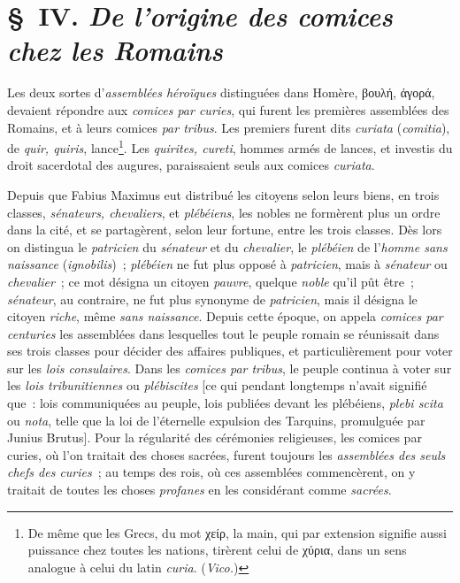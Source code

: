 \documentclass[french,twoside]{book} %
\begin{document}
\section[{§ IV. De l’origine des comices chez les Romains}]{§ IV. {\itshape De l’origine des comices chez les Romains}}
\noindent  Les deux sortes d’{\itshape assemblées héroïques} distinguées dans Homère, βουλή, ἀγορά, devaient répondre aux {\itshape comices par curies}, qui furent les premières assemblées des Romains, et à leurs comices {\itshape par tribus}. Les premiers furent dits {\itshape curiata} ({\itshape comitia}), de {\itshape quir, quiris}, lance\footnote{De même que les Grecs, du mot χείρ, la main, qui par extension signifie aussi puissance chez toutes les nations, tirèrent celui de χύρια, dans un sens analogue à celui du latin {\itshape curia}. ({\itshape Vico.})}. Les {\itshape quirites, cureti}, hommes armés de lances, et investis du droit sacerdotal des augures, paraissaient seuls aux comices {\itshape curiata}.\par
Depuis que Fabius Maximus eut distribué les citoyens selon leurs biens, en trois classes, {\itshape sénateurs, chevaliers}, et {\itshape plébéiens}, les nobles ne formèrent plus un ordre dans la cité, et se partagèrent, selon leur fortune, entre les trois classes. Dès lors on distingua le {\itshape patricien} du {\itshape sénateur} et du {\itshape chevalier}, le {\itshape plébéien} de l’{\itshape homme sans naissance} ({\itshape ignobilis}) ; {\itshape plébéien} ne fut plus opposé à {\itshape patricien}, mais à {\itshape sénateur} ou {\itshape chevalier} ; ce mot désigna un citoyen {\itshape pauvre}, quelque {\itshape noble} qu’il pût être ; {\itshape sénateur}, au contraire, ne fut plus synonyme de {\itshape patricien}, mais il désigna le citoyen {\itshape riche}, même {\itshape sans naissance}. Depuis cette époque, on appela {\itshape comices par centuries} les assemblées dans lesquelles tout le peuple romain se réunissait dans ses trois classes pour décider des affaires publiques, et particulièrement pour voter sur les {\itshape lois consulaires}. Dans les {\itshape comices par tribus}, le peuple  continua à voter sur les {\itshape lois tribunitiennes} ou {\itshape plébiscites} [ce qui pendant longtemps n’avait signifié que : lois communiquées au peuple, lois publiées devant les plébéiens, {\itshape plebi scita} ou {\itshape nota}, telle que la loi de l’éternelle expulsion des Tarquins, promulguée par Junius Brutus]. Pour la régularité des cérémonies religieuses, les comices par curies, où l’on traitait des choses sacrées, furent toujours les {\itshape assemblées des seuls chefs des curies} ; au temps des rois, où ces assemblées commencèrent, on y traitait de toutes les choses {\itshape profanes} en les considérant comme {\itshape sacrées}.
\end{document}

